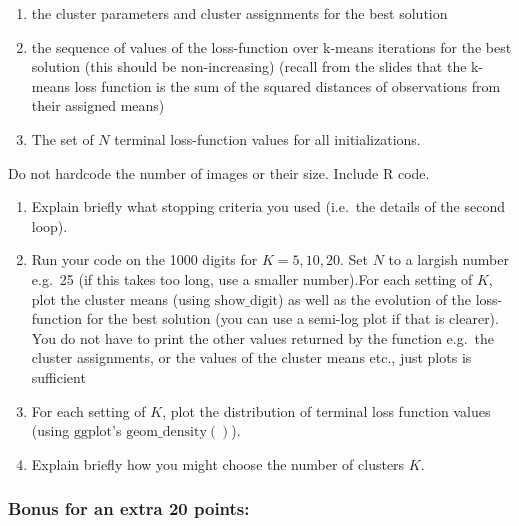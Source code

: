 \documentclass[]{article}
\providecommand{\tightlist}{%
  \setlength{\itemsep}{0pt}\setlength{\parskip}{0pt}}
\begin{document}
\begin{enumerate}
\def\labelenumi{(\alph{enumi})}
\tightlist
\item
  the cluster parameters and cluster assignments for the best solution
\item
  the sequence of values of the loss-function over k-means iterations
  for the best solution (this should be non-increasing) (recall from the
  slides that the k-means loss function is the sum of the squared
  distances of observations from their assigned means)
\item
  The set of \(N\) terminal loss-function values for all
  initializations.
\end{enumerate}

Do not hardcode the number of images or their size. Include R code.

\begin{enumerate}
\def\labelenumi{\arabic{enumi}.}
\setcounter{enumi}{2}
\item
  Explain briefly what stopping criteria you used (i.e.~the details of
  the second loop).
\item
  Run your code on the 1000 digits for \(K = 5, 10, 20\). Set \(N\) to a
  largish number e.g.~25 (if this takes too long, use a smaller
  number).For each setting of \(K\), plot the cluster means (using
  \(\mathrm{show\_digit}\)) as well as the evolution of the
  loss-function for the best solution (you can use a semi-log plot if
  that is clearer). You do not have to print the other values returned
  by the function e.g.~the cluster assignments, or the values of the
  cluster means etc., just plots is sufficient
\item
  For each setting of \(K\), plot the distribution of terminal loss
  function values (using \(\mathrm{ggplot}\)'s
  \(\mathrm{geom\_density}()\)).
\item
  Explain briefly how you might choose the number of clusters \(K\).
\end{enumerate}

\subsubsection{Bonus for an extra 20
points:}\label{bonus-for-an-extra-20-points}
\end{document}
